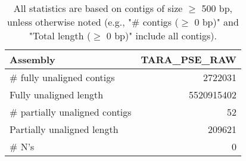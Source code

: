 \documentclass[12pt,a4paper]{article}
\begin{document}
\begin{table}[ht]
\begin{center}
\caption{All statistics are based on contigs of size $\geq$ 500 bp, unless otherwise noted (e.g., "\# contigs ($\geq$ 0 bp)" and "Total length ($\geq$ 0 bp)" include all contigs).}
\begin{tabular}{|l*{1}{|r}|}
\hline
Assembly & TARA\_PSE\_RAW \\ \hline
\# fully unaligned contigs & 2722031 \\ \hline
Fully unaligned length & 5520915402 \\ \hline
\# partially unaligned contigs & 52 \\ \hline
Partially unaligned length & 209621 \\ \hline
\# N's & 0 \\ \hline
\end{tabular}
\end{center}
\end{table}
\end{document}
